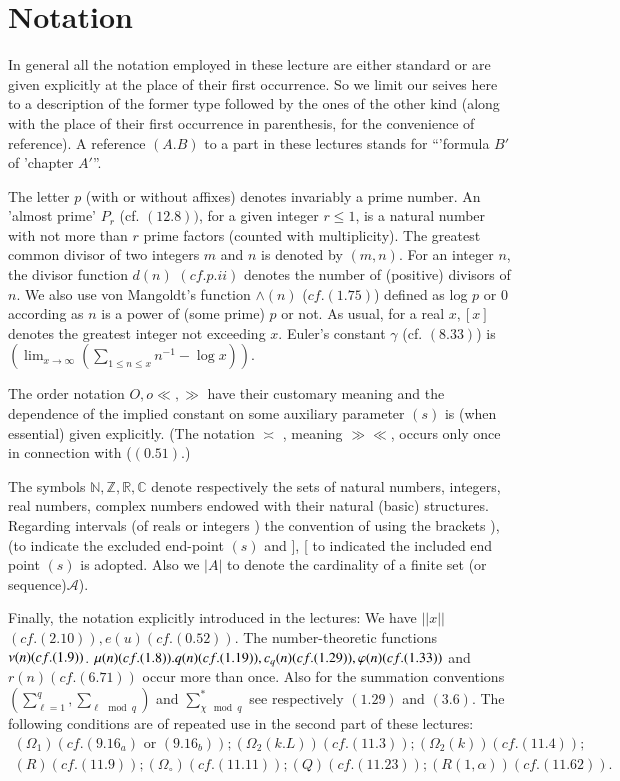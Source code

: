 \chapter{Notation}


In general all the notation employed in these lecture are either
standard or are given explicitly at the place of their first
occurrence. So we limit our seives here to a description of the former
type followed by the ones of the other kind (along with the place of
their first occurrence in parenthesis, for the convenience of
reference). A  reference $(A.B)$ to a part in these lectures stands
for ``'formula $B'$of 'chapter $A'$''. 

The letter $p$ (with or without affixes) denotes invariably a prime
number. An 'almost prime' $P_r$ (cf. $(12.8))$, for a given integer $r
\leq 1$, is a natural number with not more than $r$ prime factors
(counted with multiplicity). The greatest common divisor of two
integers $m$ and $n$ is denoted by $(m,n)$. For an integer $n$, the
divisor function $d(n)$ $(cf.p.ii)$ denotes the number of (positive)
divisors of $n$. We also use von Mangoldt's function $\wedge (n)$
($cf. (1.75)$) defined as log $p$ or $0$ according as $n$ is a power
of (some prime) $p$ or not. As usual, for a real $x,[x]$ denotes the
greatest integer not exceeding $x$. Euler's constant $\gamma$
(cf. $(8.33)$) is $(\lim_{x \to \infty}(\sum\limits_{1 \leq n \leq x}
n^{-1}- \log x))$.  

The order notation $O , o \ll , \gg$ have their customary meaning and
the dependence of the implied constant on some auxiliary parameter
$(s)$ is (when essential) given explicitly. (The notation $\asymp$ ,
meaning $\gg \ll$, occurs only once in connection with ($(0.51)$.) 

The symbols $\mathbb{N}, \mathbb{Z}, \mathbb{R}, \mathbb{C}$ denote
respectively the sets of natural numbers, integers, real numbers,
complex numbers endowed with their natural (basic)
structures. Regarding intervals (of reals or integers ) the convention
of using  the brackets ), (to indicate the excluded end-point $(s)$
and ], [ to indicated the included end point $(s)$ is adopted. Also we
    $|A|$ to denote the cardinality of a finite set (or
    sequence)$\mathcal{A}$). 

Finally, the notation explicitly introduced in the lectures: We have
$||x||$ $(cf.(2.10)), e(u) (cf. (0.52))$. The number-theoretic
functions $\nu (n)\break (cf. (1.9))$. $\mu(n) (cf.(1.8)). q(n) (cf.(1.19)),
c_q (n) (cf.(1.29)), \varphi (n)\break (cf. (1.33))$ and $r(n)(cf. (6.71))$
occur more than once. Also for the summation conventions
$(\sum\limits_{\ell =1}^{q}, \sum\limits_{\ell \mod q})$ and $
{\sum\limits^{{*}}_{\chi \mod q}}$ see respectively $(1.29)$ and
$(3.6)$. The following conditions are of repeated use in the second
part of these lectures: 
\begin{gather*}
(\Omega_1 )(cf. (9.16_a) \text{ or } (9.16_b)); (\Omega _2(k.L))
  (cf. (11.3)); (\Omega _2(k)) (cf.(11.4));\\ 
(R) (cf.(11.9)); (\Omega_\circ )(cf.(11.11)); (Q) (cf. (11.23)); (R(1,
  \alpha))(cf. (11.62)). 
\end{gather*}



